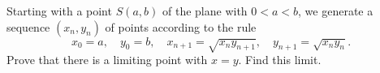 Starting with a point $S(a, b)$ of the plane with $0 < a < b$, we generate a sequence $(x_n, y_n)$ of points according to the rule
\[ x_0 = a,\quad y_0 = b,\quad x_{n+1} = \sqrt{x_ny_{n+1}},\quad y_{n+1} = \sqrt{x_ny_n}. \]
Prove that there is a limiting point with $x = y$. Find this limit.
